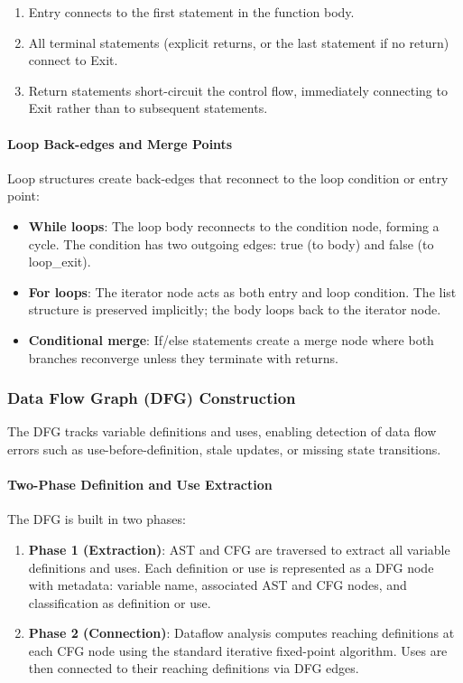 \begin{enumerate}
    \item Entry connects to the first statement in the function body.
    \item All terminal statements (explicit returns, or the last statement if no return) connect to Exit.
    \item Return statements short-circuit the control flow, immediately connecting to Exit rather than to subsequent statements.
\end{enumerate}

\paragraph{Loop Back-edges and Merge Points}

Loop structures create back-edges that reconnect to the loop condition or entry point:

\begin{itemize}
    \item \textbf{While loops}: The loop body reconnects to the condition node, forming a cycle. The condition has two outgoing edges: true (to body) and false (to loop\_exit).
    \item \textbf{For loops}: The iterator node acts as both entry and loop condition. The list structure is preserved implicitly; the body loops back to the iterator node.
    \item \textbf{Conditional merge}: If/else statements create a merge node where both branches reconverge unless they terminate with returns.
\end{itemize}

\subsubsection{Data Flow Graph (DFG) Construction}

The DFG tracks variable definitions and uses, enabling detection of data flow errors such as use-before-definition, stale updates, or missing state transitions.

\paragraph{Two-Phase Definition and Use Extraction}

The DFG is built in two phases:

\begin{enumerate}
    \item \textbf{Phase 1 (Extraction)}: AST and CFG are traversed to extract all variable definitions and uses. Each definition or use is represented as a DFG node with metadata: variable name, associated AST and CFG nodes, and classification as definition or use.
    
    \item \textbf{Phase 2 (Connection)}: Dataflow analysis computes reaching definitions at each CFG node using the standard iterative fixed-point algorithm. Uses are then connected to their reaching definitions via DFG edges.
\end{enumerate}

